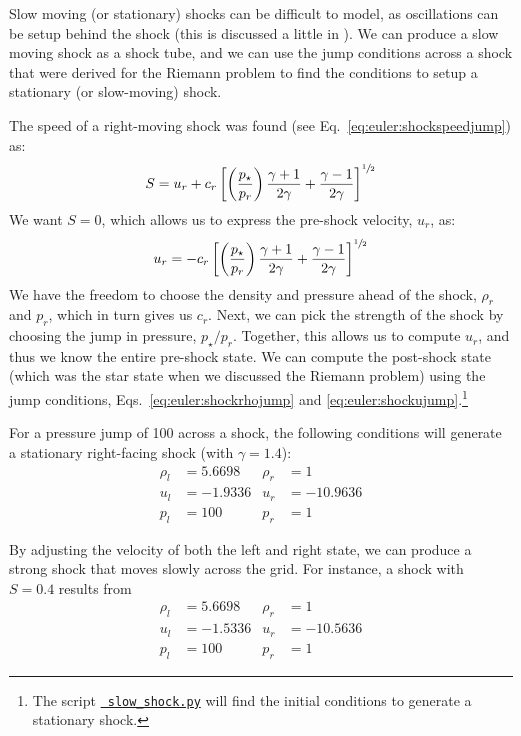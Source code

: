 Slow moving (or stationary) shocks can be difficult to model, as
oscillations can be setup behind the shock (this is discussed a little
in \cite{colellawoodward:1984,leveque:2002}).  We can produce a slow
moving shock as a shock tube, and we can use the jump conditions
across a shock that were derived for the Riemann problem to find the
conditions to setup a stationary (or slow-moving) shock.

The speed of a right-moving shock was found (see
Eq.~\ref{eq:euler:shockspeedjump}) as:
\begin{equation}
S = u_r + c_r \left [ \left ( \frac{p_\star}{p_r} \right ) \frac{\gamma+1}{2\gamma} + \frac{\gamma-1}{2\gamma} \right ]^{{\sfrac{1}{2}}}
\end{equation}
We want $S = 0$, which allows us to express the pre-shock velocity, $u_r$, as:
\begin{equation}
u_r = -c_r \left [ \left ( \frac{p_\star}{p_r} \right ) \frac{\gamma+1}{2\gamma} + \frac{\gamma-1}{2\gamma} \right ]^{{\sfrac{1}{2}}}
\end{equation}
We have the freedom to choose the density and pressure ahead of the
shock, $\rho_r$ and $p_r$, which in turn gives us $c_r$.  Next, we can
pick the strength of the shock by choosing the jump in pressure,
$p_\star/p_r$.  Together, this allows us to compute $u_r$, and thus we
know the entire pre-shock state.  We can compute the post-shock state
(which was the star state when we discussed the Riemann problem) using
the jump conditions, Eqs.~\ref{eq:euler:shockrhojump} and
\ref{eq:euler:shockujump}.\footnote{The script
  \href{https://github.com/python-hydro/hydro_examples/blob/master/compressible/slow_shock.py}{\tt
    slow\_shock.py} will find the initial conditions to generate a
  stationary shock.}

For a pressure jump of 100 across a shock, the following conditions will
generate a stationary right-facing shock (with $\gamma = 1.4$):
\begin{align}
\rho_l &= 5.6698      &  \rho_r &= 1 \nonumber \\
u_l   &= -1.9336      &  u_r    &= -10.9636   \\
p_l    &= 100         &  p_r    &= 1 \nonumber
\end{align}

By adjusting the velocity of both the left and right state, we can
produce a strong shock that moves slowly across the grid.  For
instance, a shock with $S = 0.4$ results from
\begin{align}
\rho_l &= 5.6698      &  \rho_r &= 1 \nonumber \\
u_l   &= -1.5336      &  u_r    &= -10.5636   \\
p_l    &= 100         &  p_r    &= 1 \nonumber
\end{align}

